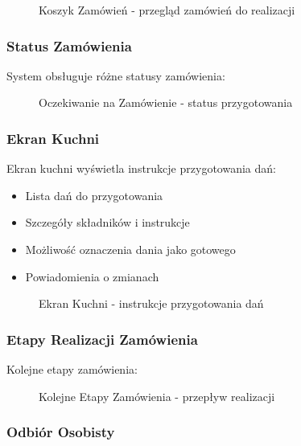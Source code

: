 \documentclass[12pt,a4paper,utf-8]{article}
\begin{document}
\begin{figure}[H]
    \centering
    \caption{Koszyk Zamówień  -  przegląd zamówień do realizacji}
    \label{fig:orders_cart}
\end{figure}

\subsubsection{Status Zamówienia}

System obsługuje różne statusy zamówienia:

\begin{figure}[H]
    \centering
    \caption{Oczekiwanie na Zamówienie  -  status przygotowania}
    \label{fig:pending_order}
\end{figure}

\subsubsection{Ekran Kuchni}

Ekran kuchni wyświetla instrukcje przygotowania dań:

\begin{itemize}
    \item Lista dań do przygotowania
    \item Szczegóły składników i instrukcje
    \item Możliwość oznaczenia dania jako gotowego
    \item Powiadomienia o zmianach
\end{itemize}

\begin{figure}[H]
    \centering
    \caption{Ekran Kuchni  -  instrukcje przygotowania dań}
    \label{fig:kitchen_display}
\end{figure}

\subsubsection{Etapy Realizacji Zamówienia}

Kolejne etapy zamówienia:

\begin{figure}[H]
    \centering
    \caption{Kolejne Etapy Zamówienia  -  przepływ realizacji}
    \label{fig:order_stages}
\end{figure}

\subsubsection{Odbiór Osobisty}
\end{document}
